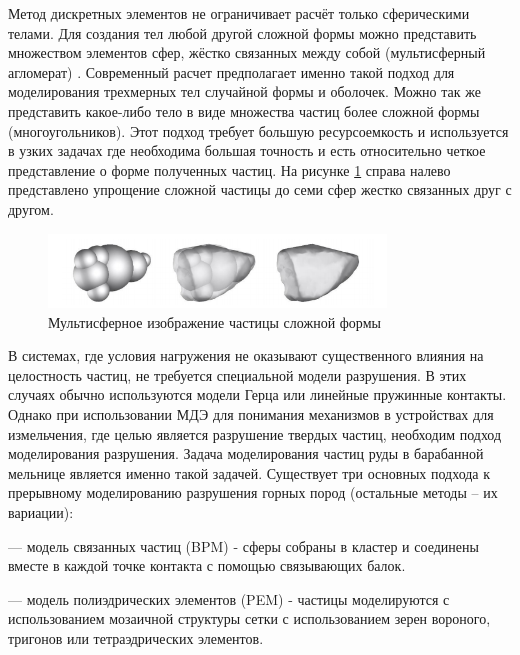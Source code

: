 \documentclass[utf8x, 14pt, oneside, a4paper]{article}
\begin{document}
Метод дискретных элементов не ограничивает расчёт только сферическими телами. 
Для создания тел любой другой сложной формы можно представить множеством элементов сфер, жёстко связанных между собой (мультисферный агломерат) \cite{aglomerath}.
Современный расчет предполагает именно такой подход для моделирования трехмерных тел случайной формы и оболочек.
Можно так же представить какое-либо тело в виде множества частиц более сложной формы (многоугольников). 
Этот подход требует большую ресурсоемкость и используется в узких задачах где необходима большая точность и есть относительно четкое представление о форме полученных частиц.
На рисунке \ref{pic:aglomerath} справа налево представлено упрощение сложной частицы до семи сфер жестко связанных друг с другом.
\begin{figure}[H]
	\centering
	\includegraphics[width=0.8\textwidth]{aglomerath}
	\caption{Мультисферное изображение частицы сложной формы \cite{another_hard}}
	\label{pic:aglomerath}
\end{figure} 

В системах, где условия нагружения не оказывают существенного влияния на целостность частиц, не требуется специальной модели разрушения. 
В этих случаях обычно используются модели Герца или линейные пружинные контакты. 
Однако при использовании МДЭ для понимания механизмов в устройствах для измельчения, где целью является разрушение твердых частиц, необходим подход моделирования разрушения.
Задача моделирования частиц руды в барабанной мельнице является именно такой задачей.
Существует три основных подхода \cite{another_hard} к прерывному моделированию разрушения горных пород (остальные методы -- их вариации):

--- модель связанных частиц (BPM) - сферы собраны в кластер и соединены вместе в каждой точке контакта с помощью связывающих балок.
 
--- модель полиэдрических элементов (PEM) - частицы моделируются с использованием мозаичной структуры сетки с использованием зерен вороного, тригонов или тетраэдрических элементов.
 
\end{document}
